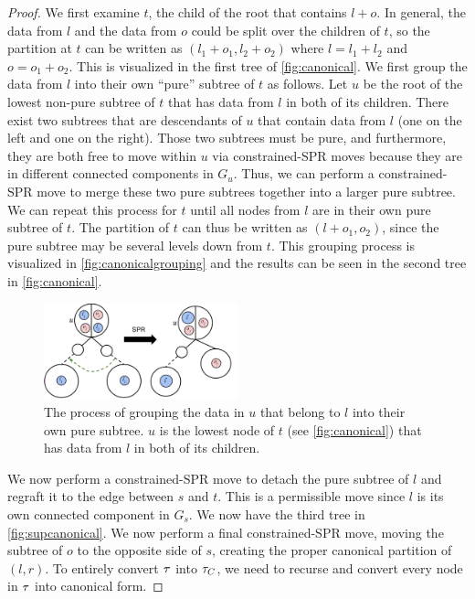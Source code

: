 \begin{proof}
We first examine $t$, the child of the root that contains $l + o$.
In general, the data from $l$ and the data from $o$ could
be split over the children of $t$, so the partition at $t$
can be written as $(l_1 + o_1, l_2 + o_2)$ where $l = l_1 + l_2$ 
and $o = o_1 + o_2$. This is visualized in the first
tree of \autoref{fig:canonical}.
We first group the data from $l$ into their own ``pure'' subtree
of $t$ as follows.
Let $u$ be the root of the
lowest non-pure subtree of $t$ that has
data from $l$ in both of its children.
There exist two subtrees that are descendants of $u$ 
that contain data from $l$ (one on the left and one on the right).
Those two subtrees
must be pure, and furthermore, they are both free to
move within $u$ via constrained-SPR moves because
they are in different connected components in $G_u$.
Thus, we can perform a constrained-SPR move to merge these
two pure subtrees together into a larger pure subtree.
We can repeat this process for $t$ until all nodes
from $l$ are in their own pure subtree of $t$.
The partition of $t$ can thus be written as
$(l + o_1, o_2)$, since the pure subtree may be several
levels down from $t$. This grouping process is visualized in
\autoref{fig:canonicalgrouping} and the results can be
seen in the second
tree in \autoref{fig:canonical}.

\begin{figure}
    \centering
    \includegraphics[width=0.5\textwidth]{img/ibhc/CanonicalTreeGrouping}
    \caption{The process of grouping the data in $u$
    that belong to $l$ into their own pure subtree. $u$ is the
    lowest node of $t$ (see \autoref{fig:canonical}) that has data from $l$
    in both of its children.}
    \label{fig:canonicalgrouping}
\end{figure}


We now perform a constrained-SPR move to detach
the pure subtree of $l$ and regraft it to
the edge between $s$ and $t$. This is a permissible
move since $l$ is its own connected component in 
$G_s$. We now have the third tree in \autoref{fig:supcanonical}.
We now perform a final constrained-SPR
move, moving the subtree of $o$ to the opposite
side of $s$, creating the proper canonical partition
of $(l, r)$.
To entirely convert $\tau$ into $\tau_C$, we need to recurse
and convert every node in $\tau$ into canonical form.


\end{proof}
